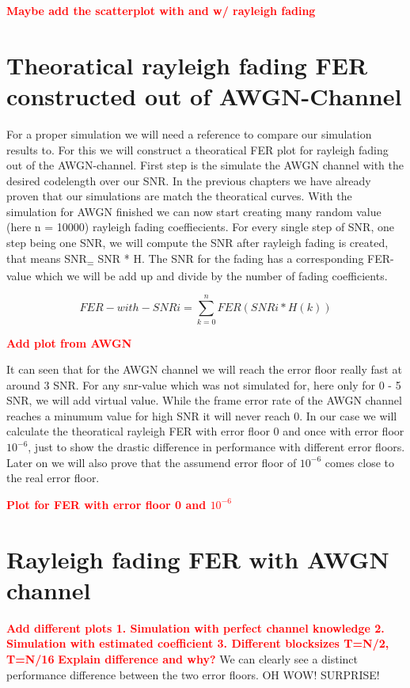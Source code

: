\documentclass[12pt,oneside, draft]{report}
\newcommand\boldred[1]{\textcolor{red}{\textbf{#1}}}
\begin{document}
\boldred{Maybe add the scatterplot with and w/ rayleigh fading}

\section{Theoratical rayleigh fading FER constructed out of AWGN-Channel}

For a proper simulation we will need a reference to compare our simulation results to. For this we will construct a theoratical FER plot for rayleigh fading out of the AWGN-channel.
First step is the simulate the AWGN channel with the desired codelength over our SNR. In the previous chapters we have already proven that our simulations are match the theoratical curves. With the simulation for AWGN finished we can now start creating
many random value (here n = 10000) rayleigh fading coeffiecients. For every single step of SNR, one step being one SNR, we will compute the SNR after rayleigh fading is created, that means SNR\textsubscript = SNR * H. The SNR for the fading has a corresponding FER-value which we will be add up and divide by the number of fading coefficients.


\begin{equation}
\label{eq:theo}
FER-with-SNRi = \sum_{k = 0}^n FER(SNRi * H(k))
\end{equation}

\boldred{Add plot from AWGN}

It can seen that for the AWGN channel we will reach the error floor really fast at around 3 SNR. For any snr-value which was not simulated for, here only for 0 - 5 SNR, we will add virtual value. While the frame error rate of the AWGN channel reaches a minumum value for high SNR it will never reach 0. In our case we will calculate the theoratical rayleigh FER with error floor 0 and once with error floor $10^{-6}$, just to show the drastic difference in performance with different error floors. Later on we will also prove that the assumend error floor of 
$10^{-6}$ comes close to the real error floor. 

\boldred{Plot for FER with error floor 0 and $10^{-6}$}


\section{Rayleigh fading FER with AWGN channel}


\boldred{Add different plots 1. Simulation with perfect channel knowledge 2. Simulation with estimated coefficient 3. Different blocksizes T=N/2, T=N/16}
\boldred{Explain difference and why?}
We can clearly see a distinct performance difference between the two error floors. OH WOW! SURPRISE!
\end{document}
